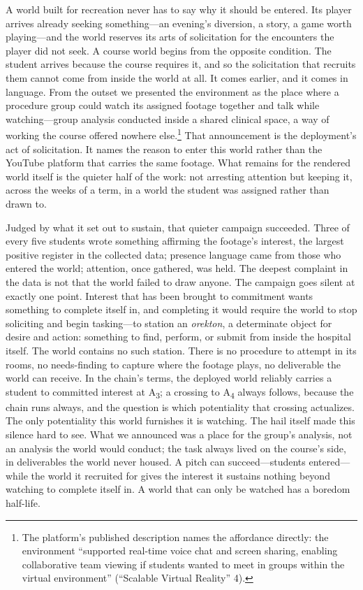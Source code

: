 A world built for recreation never has to say why it should be entered.
Its player arrives already seeking something---an evening's diversion, a
story, a game worth playing---and the world reserves its arts of
solicitation for the encounters the player did not seek. A course world
begins from the opposite condition. The student arrives because the
course requires it, and so the solicitation that recruits them cannot
come from inside the world at all. It comes earlier, and it comes in
language. From the outset we presented the environment as the place
where a procedure group could watch its assigned footage together and
talk while watching---group analysis conducted inside a shared clinical
space, a way of working the course offered nowhere else.\footnote{The
platform's published description names the affordance directly: the
environment ``supported real-time voice chat and screen sharing,
enabling collaborative team viewing if students wanted to meet in
groups within the virtual environment'' (``Scalable Virtual
Reality'' 4).} That
announcement is the deployment's act of solicitation. It names the
reason to enter this world rather than the YouTube platform that
carries the same footage. What remains for the rendered world itself is
the quieter half of the work: not arresting attention but keeping it,
across the weeks of a term, in a world the student was assigned rather
than drawn to.

Judged by what it set out to sustain, that quieter campaign succeeded.
Three of every five students wrote something affirming the footage's
interest, the largest positive register in the collected data;
presence language came from those who entered the world; attention,
once gathered, was held. The deepest complaint in the data is not that
the world failed to draw anyone. The campaign goes silent at exactly one
point. Interest that has been brought to commitment wants something to
complete itself in, and completing it would require the world to stop
soliciting and begin tasking---to station an \textit{orekton}, a
determinate object for desire and action: something to find, perform,
or submit from inside the hospital itself. The world contains no such
station. There is no procedure to attempt in its rooms, no
needs-finding to capture where the footage plays, no deliverable the
world can receive. In the chain's terms, the deployed world reliably
carries a student to committed interest at A\textsubscript{3}; a
crossing to A\textsubscript{4} always follows, because the chain runs
always, and the question is which potentiality that crossing
actualizes. The only potentiality this world furnishes it is watching. The hail itself made this
silence hard to see. What we announced was a place for the group's
analysis, not an analysis the world would conduct; the task always
lived on the course's side, in deliverables the world never housed. A
pitch can succeed---students entered---while the world it recruited for
gives the interest it sustains nothing beyond watching to complete itself
in. A world that can only be watched has a boredom half-life.

